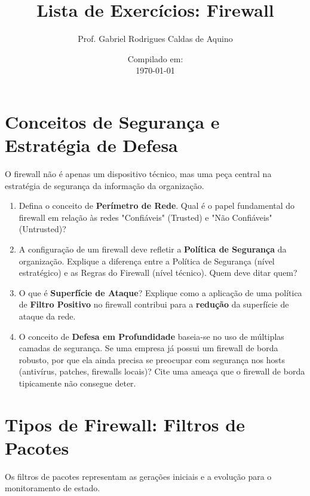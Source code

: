     \title{Lista de Exercícios: Firewall}
        \author{Prof. Gabriel Rodrigues Caldas de Aquino}
        \date{Compilado em: \\ \today}



\maketitle

\section{Conceitos de Segurança e Estratégia de Defesa}
O firewall não é apenas um dispositivo técnico, mas uma peça central na estratégia de segurança da informação da organização.

\begin{enumerate}
    \item Defina o conceito de \textbf{Perímetro de Rede}. Qual é o papel fundamental do firewall em relação às redes "Confiáveis" (Trusted) e "Não Confiáveis" (Untrusted)?
    \item A configuração de um firewall deve refletir a \textbf{Política de Segurança} da organização. Explique a diferença entre a Política de Segurança (nível estratégico) e as Regras do Firewall (nível técnico). Quem deve ditar quem?
    \item O que é \textbf{Superfície de Ataque}? Explique como a aplicação de uma política de \textbf{Filtro Positivo} no firewall contribui para a \textbf{redução} da superfície de ataque da rede.
    \item O conceito de \textbf{Defesa em Profundidade} baseia-se no uso de múltiplas camadas de segurança. Se uma empresa já possui um firewall de borda robusto, por que ela ainda precisa se preocupar com segurança nos hosts (antivírus, patches, firewalls locais)? Cite uma ameaça que o firewall de borda tipicamente não consegue deter.
\end{enumerate}

\section{Tipos de Firewall: Filtros de Pacotes}
Os filtros de pacotes representam as gerações iniciais e a evolução para o monitoramento de estado.

